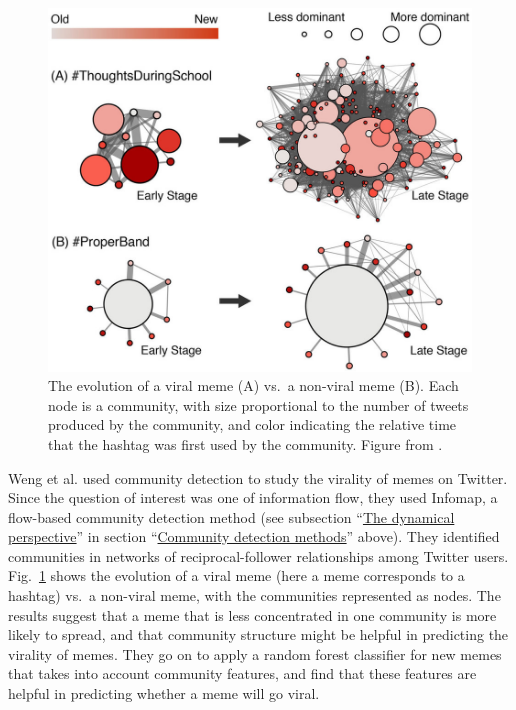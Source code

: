 \begin{figure}
\centering
\includegraphics{img/weng2013_fig4_viraltwitter.jpg}
\caption{The evolution of a viral meme (A) vs.~a non-viral meme (B).
Each node is a community, with size proportional to the number of tweets
produced by the community, and color indicating the relative time that
the hashtag was first used by the community. Figure from
\autocite{weng_virality_2013}.}\label{fig:viraltwitter}
\end{figure}

Weng et al. \autocite{weng_virality_2013} used community detection to
study the virality of memes on Twitter. Since the question of interest
was one of information flow, they used Infomap, a flow-based community
detection method (see subsection
``\protect\hyperlink{the-dynamical-perspective}{The dynamical
perspective}'' in section
``\protect\hyperlink{community-detection-methods}{Community detection
methods}'' above). They identified communities in networks of
reciprocal-follower relationships among Twitter users.
Fig.~\ref{fig:viraltwitter} shows the evolution of a viral meme (here a
meme corresponds to a hashtag) vs.~a non-viral meme, with the
communities represented as nodes. The results suggest that a meme that
is less concentrated in one community is more likely to spread, and that
community structure might be helpful in predicting the virality of
memes. They go on to apply a random forest classifier for new memes that
takes into account community features, and find that these features are
helpful in predicting whether a meme will go viral.

